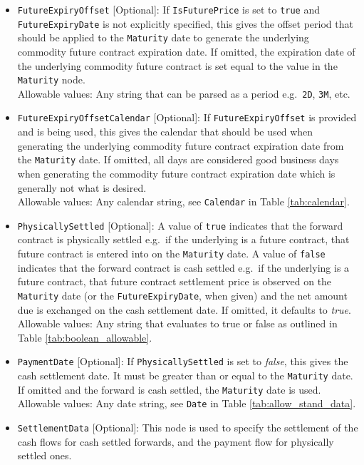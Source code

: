 \begin{itemize}
\item \lstinline!FutureExpiryOffset! [Optional]: If \lstinline!IsFuturePrice! is set to \lstinline!true! and \lstinline!FutureExpiryDate! is not explicitly specified, this gives the offset period that should be applied to the \lstinline!Maturity! date to generate the underlying commodity future contract expiration date. If omitted, the expiration date of the underlying commodity future contract is set equal to the value in the \lstinline!Maturity! node. \\
Allowable values: Any string that can be parsed as a period e.g.\ \lstinline!2D!, \lstinline!3M!, etc.

\item \lstinline!FutureExpiryOffsetCalendar! [Optional]: If \lstinline!FutureExpiryOffset! is provided and is being used, this gives the calendar that should be used when generating the underlying commodity future contract expiration date from the \lstinline!Maturity! date. If omitted, all days are considered good business days when generating the commodity future contract expiration date which is generally not what is desired. \\
Allowable values: Any calendar string, see \lstinline!Calendar! in Table \ref{tab:calendar}.

\item \lstinline!PhysicallySettled! [Optional]: A value of \lstinline!true! indicates that the forward contract is physically settled e.g.\ if the underlying is a future contract, that future contract is entered into on the \lstinline!Maturity! date. A value of \lstinline!false! indicates that the forward contract is cash settled e.g.\ if the underlying is a future contract, that future contract settlement price is observed on the \lstinline!Maturity! date (or the \lstinline!FutureExpiryDate!, when given) and the net amount due is exchanged on the cash settlement date. If omitted, it defaults to \emph{true}. \\
Allowable values: Any string that evaluates to true or false as outlined in Table \ref{tab:boolean_allowable}.

\item \lstinline!PaymentDate! [Optional]: If \lstinline!PhysicallySettled! is set to \emph{false}, this gives the cash settlement date. It must be greater than or equal to the \lstinline!Maturity! date. If omitted and the forward is cash settled, the \lstinline!Maturity! date is used. \\
Allowable values: Any date string, see \lstinline!Date! in Table \ref{tab:allow_stand_data}.

\item \lstinline!SettlementData! [Optional]: This node is used to specify  the settlement of the cash flows for cash settled forwards, and the payment flow for physically settled ones.
\end{itemize}

